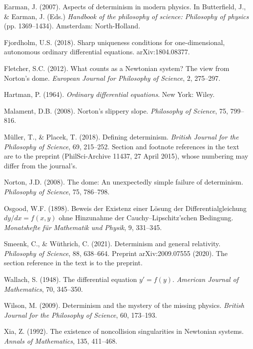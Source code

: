 \documentclass[12pt]{article}
\theoremstyle{plain}
\theoremstyle{definition}
\theoremstyle{remark}
\begin{document}
\begin{thebibliography}{}
Earman, J. (2007). Aspects of determinism in modern physics. In Butterfield, J.,
\& Earman, J. (Eds.) \emph{Handbook of the philosophy of science: Philosophy of
physics} (pp. 1369--1434). Amsterdam: North-Holland.

Fjordholm, U.S. (2018). Sharp uniqueness conditions for one-dimensional,
autonomous ordinary differential equations. arXiv:1804.08377.

Fletcher, S.C. (2012). What counts as a Newtonian system? The view from Norton's
dome. \emph{European Journal for Philosophy of Science}, 2, 275--297.

Hartman, P. (1964). \emph{Ordinary differential equations}. New York: Wiley.

Malament, D.B. (2008). Norton's slippery slope. \emph{Philosophy of Science},
75, 799--816.

M\"uller, T., \& Placek, T. (2018). Defining determinism. \emph{British Journal
for the Philosophy of Science}, 69, 215--252. Section and footnote references in
the text are to the preprint (PhilSci-Archive 11437, 27 April 2015), whose
numbering may differ from the journal's.

Norton, J.D. (2008). The dome: An unexpectedly simple failure of determinism.
\emph{Philosophy of Science}, 75, 786--798.

Osgood, W.F. (1898). Beweis der Existenz einer L\"osung der
Differentialgleichung $dy/dx=f(x,y)$ ohne Hinzunahme der
Cauchy--Lipschitz'schen Bedingung. \emph{Monatshefte f\"ur Mathematik und
Physik}, 9, 331--345.

Smeenk, C., \& W\"uthrich, C. (2021). Determinism and general relativity.
\emph{Philosophy of Science}, 88, 638--664. Preprint arXiv:2009.07555 (2020).
The section reference in the text is to the preprint.

Wallach, S. (1948). The differential equation $y'=f(y)$. \emph{American Journal
of Mathematics}, 70, 345--350.

Wilson, M. (2009). Determinism and the mystery of the missing physics.
\emph{British Journal for the Philosophy of Science}, 60, 173--193.

Xia, Z. (1992). The existence of noncollision singularities in Newtonian
systems. \emph{Annals of Mathematics}, 135, 411--468.

\end{thebibliography}
\end{document}
